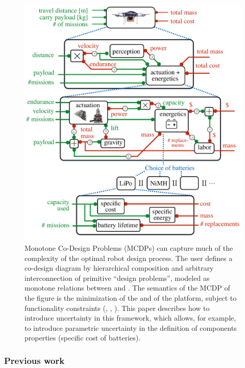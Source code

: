 \begin{figure}
    \begin{centering}
        \includegraphics[scale=0.33]{unc_bigproblem}
    \end{centering}
    \caption{\label{fig:Example1}Monotone Co-Design Problems (MCDPs) can capture
    much of the complexity of the optimal robot design process. The user
    defines a co-design diagram by hierarchical composition and arbitrary
    interconnection of primitive ``design problems'', modeled as monotone
    relations between  and . The semantics
    of the MCDP of the figure is the minimization of the 
    and  of the platform, subject to functionality constraints
        (, , ). This paper
        describes how to introduce uncertainty in this framework, which allows,
        for example, to introduce parametric uncertainty in the definition
        of components properties (\eg  specific cost of batteries).}
\end{figure}


\subsubsection*{Previous work}

